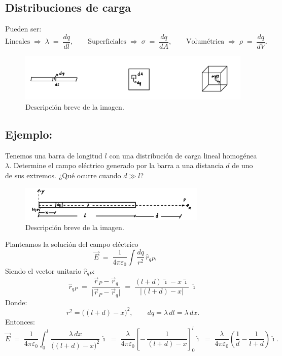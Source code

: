 \documentclass[a4paper,12pt]{article}
\begin{document}
\subsection*{Distribuciones de carga}
Pueden ser:
\[
\text{Lineales} \;\Rightarrow\; \lambda \;=\; \frac{dq}{dl},
\qquad
\text{Superficiales} \;\Rightarrow\; \sigma \;=\; \frac{dq}{dA},
\qquad
\text{Volumétrica} \;\Rightarrow\; \rho \;=\; \frac{dq}{dV}.
\]
\vspace{-2.0em}
\begin{figure}[h]
  \centering
  \includegraphics[width=1.0\textwidth]{imagen_2.jpeg}
  \caption{Descripción breve de la imagen.}
  \label{fig:imagen2}
\end{figure}

\subsection*{Ejemplo:}
\noindent
Tenemos una barra de longitud $l$ con una distribución de carga lineal homogénea $\lambda$.
Determine el campo eléctrico generado por la barra a una distancia $d$ de uno de sus extremos.
¿Qué ocurre cuando $d \gg l$?

\begin{figure}[h]
  \centering
  \includegraphics[width=0.8\textwidth]{imagen_3.jpeg}
  \caption{Descripción breve de la imagen.}
  \label{fig:imagen3}
\end{figure}
Planteamos la solución del campo eléctrico
\[
\vec E \;=\; \frac{1}{4\pi\varepsilon_0}\int \frac{dq}{r^2}\,\hat r_{qP},
\qquad
\]
Siendo el vector unitario $\hat{r}_{qP}$:
\[
\hat r_{qP} \;=\; \frac{\vec r_P-\vec r_q}{\lvert \vec r_P-\vec r_q\rvert}
\;=\; \frac{(l+d)\,\hat{\imath}-x\,\hat{\imath}}{\lvert (l+d)-x\rvert}
\; \hat{\imath}
\]
Donde:
\[
r^2 = \bigl((l+d)-x\bigr)^2,
\qquad
dq = \lambda\,dl = \lambda\,dx.
\]
Entonces:
\[
\vec E \;=\; \frac{1}{4\pi\varepsilon_0}\int_{0}^{l}
\frac{\lambda\,dx}{\bigl((l+d)-x\bigr)^2}\,\hat{\imath}
\;=\;
\frac{\lambda}{4\pi\varepsilon_0}\left[ -\,\frac{1}{(l+d)-x} \right]_{0}^{l}\hat{\imath}
\;=\;
\frac{\lambda}{4\pi\varepsilon_0}\!\left(\frac{1}{d}-\frac{1}{l+d}\right)\hat{\imath}.
\]
\end{document}
